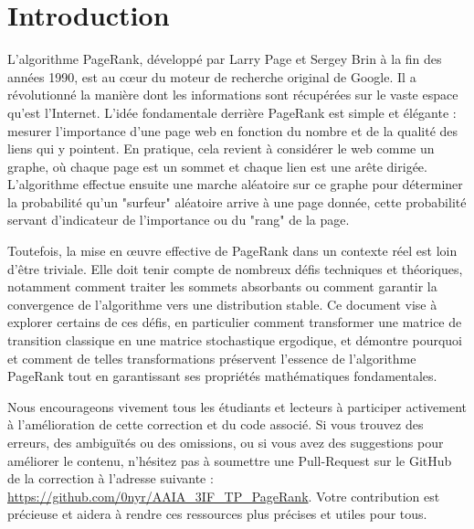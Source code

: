 
\section*{Introduction}

L'algorithme PageRank, développé par Larry Page et Sergey Brin à la fin des années 1990, est au cœur du moteur de recherche original de Google. Il a révolutionné la manière dont les informations sont récupérées sur le vaste espace qu'est l'Internet. L'idée fondamentale derrière PageRank est simple et élégante : mesurer l'importance d'une page web en fonction du nombre et de la qualité des liens qui y pointent. En pratique, cela revient à considérer le web comme un graphe, où chaque page est un sommet et chaque lien est une arête dirigée. L'algorithme effectue ensuite une marche aléatoire sur ce graphe pour déterminer la probabilité qu'un "surfeur" aléatoire arrive à une page donnée, cette probabilité servant d'indicateur de l'importance ou du "rang" de la page.

Toutefois, la mise en œuvre effective de PageRank dans un contexte réel est loin d'être triviale. Elle doit tenir compte de nombreux défis techniques et théoriques, notamment comment traiter les sommets absorbants ou comment garantir la convergence de l'algorithme vers une distribution stable. Ce document vise à explorer certains de ces défis, en particulier comment transformer une matrice de transition classique en une matrice stochastique ergodique, et démontre pourquoi et comment de telles transformations préservent l'essence de l'algorithme PageRank tout en garantissant ses propriétés mathématiques fondamentales.

Nous encourageons vivement tous les étudiants et lecteurs à participer activement à l'amélioration de cette correction et du code associé. Si vous trouvez des erreurs, des ambiguïtés ou des omissions, ou si vous avez des suggestions pour améliorer le contenu, n'hésitez pas à soumettre une Pull-Request sur le GitHub de la correction à l'adresse suivante : \url{https://github.com/0nyr/AAIA_3IF_TP_PageRank}. Votre contribution est précieuse et aidera à rendre ces ressources plus précises et utiles pour tous.